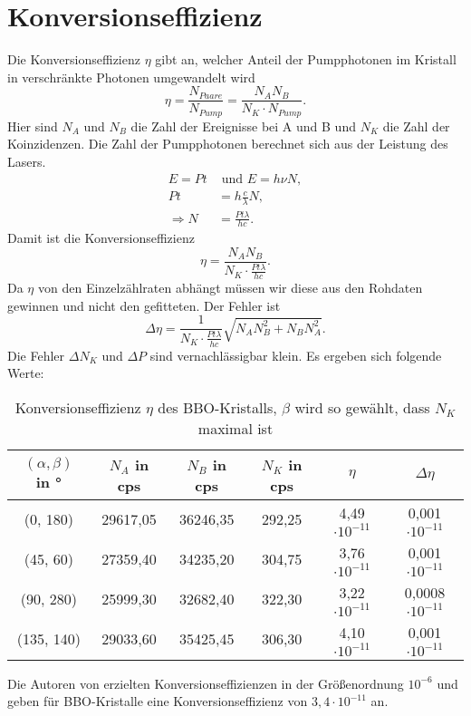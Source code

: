 \documentclass[twoside,colorback,accentcolor=tud4c,11pt]{tudreport}
\begin{document}
\section{Konversionseffizienz}
Die Konversionseffizienz $ \eta $ gibt an, welcher Anteil der Pumpphotonen im Kristall in verschränkte Photonen umgewandelt wird \cite{paper}
\begin{equation}
\eta = \frac{N_{Paare}}{N_{Pump}}=\frac{N_{A}N_{B}}{N_{K}\cdot N_{Pump}}.
\end{equation}
Hier sind $ N_{A} $ und $ N_{B} $ die Zahl der Ereignisse bei A und B und $ N_{K} $ die Zahl der Koinzidenzen. Die Zahl der Pumpphotonen berechnet sich aus der Leistung des Lasers.
\begin{align*}
E=P t &\text{ und } E=h \nu N,\\
P t &= h \frac{c}{\lambda} N,\\
\Rightarrow N &= \frac{P t \lambda}{h c}.
\end{align*}
Damit ist die Konversionseffizienz 
\begin{equation}
\eta=\frac{N_{A}N_{B}}{N_{K}\cdot \frac{P t \lambda}{h c}}.
\end{equation}
Da $ \eta $ von den Einzelzählraten abhängt müssen wir diese aus den Rohdaten gewinnen und nicht den gefitteten. Der Fehler ist 
\begin{equation}
\Delta\eta=\frac{1}{N_{K}\cdot \frac{P t \lambda}{h c}}\sqrt{N_{A}N_{B}^2+N_{B}N_{A}^2}.
\end{equation}
Die Fehler $ \Delta N_K $ und $ \Delta P $ sind vernachlässigbar klein. Es ergeben sich folgende Werte:
\begin{table}[H]
\renewcommand*{\arraystretch}{1.2}
\centering
\begin{tabular}{|c|c|c|c|c|c|}
\hline 
$(\alpha,\beta)$ in ° & $ N_A $ in cps & $ N_B $ in cps & $ N_K $ in cps & $ \eta $ &$ \Delta\eta $\\ 
\hline 
(0, 180) & 29617,05 &36246,35& 292,25& 4,49$\cdot10^{-11}$& 0,001$\cdot10^{-11}$ \\ 
\hline 
(45, 60) & 27359,40& 34235,20 &304,75 &3,76$\cdot10^{-11}$& 0,001$\cdot10^{-11}$ \\ 
\hline 
(90, 280) & 25999,30& 32682,40 &322,30 &3,22$\cdot10^{-11}$ & 0,0008$\cdot10^{-11}$\\ 
\hline 
(135, 140) & 29033,60 &35425,45&306,30 &4,10$\cdot10^{-11}$ & 0,001$\cdot10^{-11}$\\ 
\hline 
\end{tabular} 
\caption{Konversionseffizienz $ \eta $ des BBO-Kristalls, $ \beta $ wird so gewählt, dass $ N_K $ maximal ist}\label{effizienz}
\end{table}
Die Autoren von \cite{paper} erzielten Konversionseffizienzen in der Größenordnung $ 10^{-6} $ und geben für BBO-Kristalle eine Konversionseffizienz von $ 3,4\cdot10^{-11} $ an.
\end{document}
